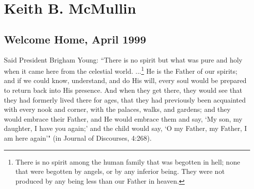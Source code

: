 \section{Keith B. McMullin}

\subsection{Welcome Home, April 1999}

Said President Brigham Young: ``There is no spirit but what was pure and holy when it came here from the celestial world. ...\footnote{There is no spirit among the human family that was begotten in hell; none that were begotten by angels, or by any inferior being. They were not produced by any being less than our Father in heaven.} He is the Father of our spirits; and if we could know, understand, and do His will, every soul would be prepared to return back into His presence. And when they get there, they would see that they had formerly lived there for ages, that they had previously been acquainted with every nook and corner, with the palaces, walks, and gardens; and they would embrace their Father, and He would embrace them and say, `My son, my daughter, I have you again;' and the child would say, `O my Father, my Father, I am here again'" (in Journal of Discourses, 4:268).